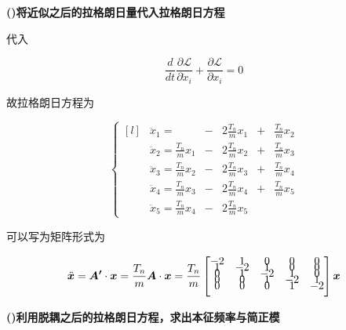 \documentclass[11pt, a4paper, oneside]{ctexart}
\begin{document}
{\vspace{5mm}
\textbf{()将近似之后的拉格朗日量代入拉格朗日方程}

\vspace{5mm}代入

\begin{equation}
    \frac{d}{dt}\frac{\partial\mathscr{L}}{\partial \dot x_i}
    +\frac{\partial\mathscr{L}}{\partial x_i}
    = 0
\end{equation}

故拉格朗日方程为

\begin{equation}
    \left\{
    \begin{aligned}[l]
    &\ddot{x}_{1}=&-&2 \frac{T_n}{m} x_{1}&+&\frac{T_n}{m} x_{2} \\
    &\ddot{x}_{2}=\frac{T_n}{m} x_1&-&2 \frac{T_n}{m} x_{2}&+&\frac{T_n}{m} x_3 \\
    &\ddot{x}_{3}=\frac{T_n}{m} x_2&-&2 \frac{T_n}{m} x_{3}&+&\frac{T_n}{m} x_{4} \\
    &\ddot{x}_{4}=\frac{T_n}{m} x_{3}&-&2 \frac{T_n}{m} x_{4}&+&\frac{T_n}{m} x_{5} \\
    &\ddot{x}_{5}=\frac{T_n}{m} x_{4}&-&2 \frac{T_n}{m} x_{5}
    \end{aligned}\right.
\end{equation}

可以写为矩阵形式为


\begin{equation}
    \ddot{\boldsymbol{x}}=\boldsymbol{A'} \cdot \boldsymbol{x}=\frac{T_n}{m}\boldsymbol{A} \cdot \boldsymbol{x}=\frac{T_n}{m}\left
    [\begin{matrix}\vspace{-1.5ex}
    -2 & 1 & 0 & 0 & 0 \\\vspace{-1.5ex} 
    1 & -2 & 1 & 0 & 0 \\\vspace{-1.5ex} 
    0 & 1 & -2 & 1 & 0 \\\vspace{-1.5ex} 
    0 & 0 & 1 & -2 & 1 \\\vspace{-1.5ex} 
    0 & 0 & 0 & 1 & -2\vspace{2.5ex} 
    \end{matrix}\right] \boldsymbol{x}
    \end{equation}

\vspace{5mm}
    \textbf{()利用脱耦之后的拉格朗日方程，求出本征频率与简正模}
    \vspace{5mm}

}
\end{document}
